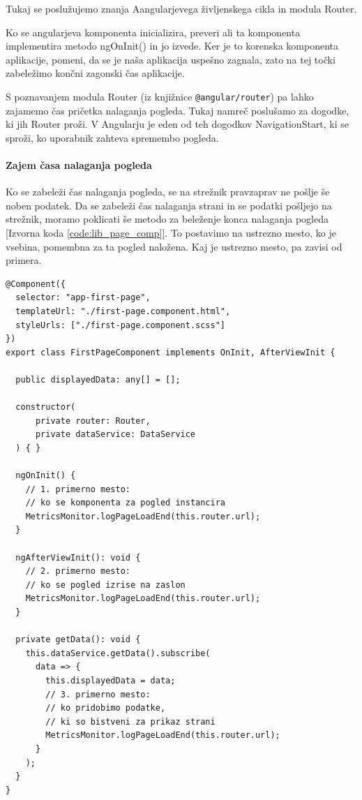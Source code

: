 \documentclass[a4paper, 12pt]{book}
\begin{document}
Tukaj se poslužujemo znanja Aangularjevega življenskega cikla in modula Router.

Ko se angularjeva komponenta inicializira, preveri ali ta komponenta implementira metodo ngOnInit() in jo izvede. Ker je to korenska komponenta aplikacije, pomeni, da se je naša aplikacija uspešno zagnala, zato na tej točki zabeležimo končni zagonski čas aplikacije.

S poznavanjem modula Router (iz knjižnice \verb|@angular/router|) pa lahko zajamemo čas pričetka nalaganja pogleda. Tukaj namreč poslušamo za dogodke, ki jih Router proži. V Angularju je eden od teh dogodkov NavigationStart, ki se sproži, ko uporabnik zahteva spremembo pogleda.

\paragraph{Zajem časa nalaganja pogleda}

Ko se zabeleži čas nalaganja pogleda, se na strežnik pravzaprav ne pošlje še noben podatek. Da se zabeleži čas nalaganja strani in se podatki pošljejo na strežnik, moramo poklicati še metodo za beleženje konca nalaganja pogleda [Izvorna koda \ref{code:lib_page_comp}]. To postavimo na ustrezno mesto, ko je vsebina, pomembna za ta pogled naložena. Kaj je ustrezno mesto, pa zavisi od primera.

\begin{lstlisting}[label=code:lib_page_comp, caption=Zajem časa nalaganja pogleda]
@Component({
  selector: "app-first-page",
  templateUrl: "./first-page.component.html",
  styleUrls: ["./first-page.component.scss"]
})
export class FirstPageComponent implements OnInit, AfterViewInit {

  public displayedData: any[] = [];

  constructor(
      private router: Router,
      private dataService: DataService
  ) { }

  ngOnInit() {
    // 1. primerno mesto:
    // ko se komponenta za pogled instancira
    MetricsMonitor.logPageLoadEnd(this.router.url);
  }

  ngAfterViewInit(): void {
    // 2. primerno mesto:
    // ko se pogled izrise na zaslon
    MetricsMonitor.logPageLoadEnd(this.router.url);
  }

  private getData(): void {
    this.dataService.getData().subscribe(
      data => {
        this.displayedData = data;
        // 3. primerno mesto:
        // ko pridobimo podatke,
        // ki so bistveni za prikaz strani
        MetricsMonitor.logPageLoadEnd(this.router.url);
      }
    );
  }
}
\end{lstlisting}
\end{document}
